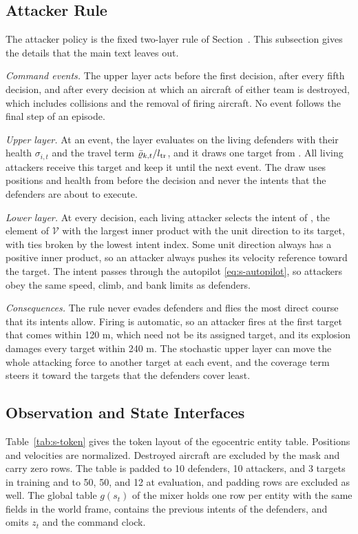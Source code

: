 \subsection{Attacker Rule}
The attacker policy is the fixed two-layer rule of Section~. This subsection gives the details that the main text leaves out.

\emph{Command events.} The upper layer acts before the first decision, after every fifth decision, and after every decision at which an aircraft of either team is destroyed, which includes collisions and the removal of firing aircraft. No event follows the final step of an episode.

\emph{Upper layer.} At an event, the layer evaluates  on the living defenders with their health $\sigma_{i,t}$ and the travel term $\bar\varrho_{k,t}/l_{\rm tr}$, and it draws one target from . All living attackers receive this target and keep it until the next event. The draw uses positions and health from before the decision and never the intents that the defenders are about to execute.

\emph{Lower layer.} At every decision, each living attacker selects the intent of , the element of $\mathcal V$ with the largest inner product with the unit direction to its target, with ties broken by the lowest intent index. Some unit direction always has a positive inner product, so an attacker always pushes its velocity reference toward the target. The intent passes through the autopilot \eqref{eq:s-autopilot}, so attackers obey the same speed, climb, and bank limits as defenders.

\emph{Consequences.} The rule never evades defenders and flies the most direct course that its intents allow. Firing is automatic, so an attacker fires at the first target that comes within 120 m, which need not be its assigned target, and its explosion damages every target within 240 m. The stochastic upper layer can move the whole attacking force to another target at each event, and the coverage term steers it toward the targets that the defenders cover least.

\subsection{Observation and State Interfaces}
Table~\ref{tab:s-token} gives the token layout of the egocentric entity table. Positions and velocities are normalized. Destroyed aircraft are excluded by the mask and carry zero rows. The table is padded to 10 defenders, 10 attackers, and 3 targets in training and to 50, 50, and 12 at evaluation, and padding rows are excluded as well. The global table $g(s_t)$ of the mixer holds one row per entity with the same fields in the world frame, contains the previous intents of the defenders, and omits $z_t$ and the command clock.

